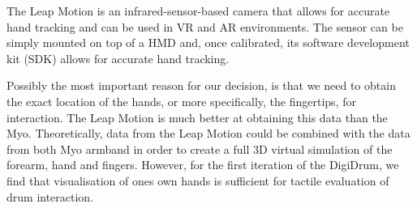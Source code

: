 \documentclass{article}
\begin{document}


The Leap Motion \cite{leapwebsite} is an infrared-sensor-based camera that allows for accurate hand tracking and can be used in VR and AR environments. The sensor can be simply mounted on top of a HMD and, once calibrated, its software development kit (SDK) allows for accurate hand tracking.

Possibly the most important reason for our decision, is that we need to obtain the exact location of the hands, or more specifically, the fingertips, for interaction. The Leap Motion is much better at obtaining this data than the Myo. Theoretically, data from the Leap Motion could be combined with the data from both Myo armband in order to create a full 3D virtual simulation of the forearm, hand and fingers. However, for the first iteration of the DigiDrum, we find that visualisation of ones own hands is sufficient for tactile evaluation of drum interaction.
\end{document}

